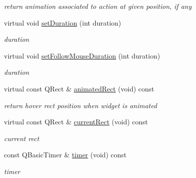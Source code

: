 \begin{DoxyCompactItemize}
\begin{DoxyCompactList}\small\item\em return animation associated to action at given position, if any \end{DoxyCompactList}\item 
\mbox{\label{class_tool_bar_data_a68ea797417401cbd4170a8e5b9e54eb8}} 
virtual void \hyperlink{class_tool_bar_data_a68ea797417401cbd4170a8e5b9e54eb8}{set\+Duration} (int duration)
\begin{DoxyCompactList}\small\item\em duration \end{DoxyCompactList}\item 
\mbox{\label{class_tool_bar_data_acadc415d3bf6c4e5152bbdba0746dbbb}} 
virtual void \hyperlink{class_tool_bar_data_acadc415d3bf6c4e5152bbdba0746dbbb}{set\+Follow\+Mouse\+Duration} (int duration)
\begin{DoxyCompactList}\small\item\em duration \end{DoxyCompactList}\item 
\mbox{\label{class_tool_bar_data_a4af45a1cfbde47e76145b520f43c0213}} 
virtual const Q\+Rect \& \hyperlink{class_tool_bar_data_a4af45a1cfbde47e76145b520f43c0213}{animated\+Rect} (void) const
\begin{DoxyCompactList}\small\item\em return \textquotesingle{}hover\textquotesingle{} rect position when widget is animated \end{DoxyCompactList}\item 
\mbox{\label{class_tool_bar_data_ae1dc9dbeef46faf11a7875761a3f1de2}} 
virtual const Q\+Rect \& \hyperlink{class_tool_bar_data_ae1dc9dbeef46faf11a7875761a3f1de2}{current\+Rect} (void) const
\begin{DoxyCompactList}\small\item\em current rect \end{DoxyCompactList}\item 
\mbox{\label{class_tool_bar_data_a9553eefa37d2f6ab6d4aacaedb065394}} 
const Q\+Basic\+Timer \& \hyperlink{class_tool_bar_data_a9553eefa37d2f6ab6d4aacaedb065394}{timer} (void) const
\begin{DoxyCompactList}\small\item\em timer \end{DoxyCompactList}\item 

\end{DoxyCompactItemize}

